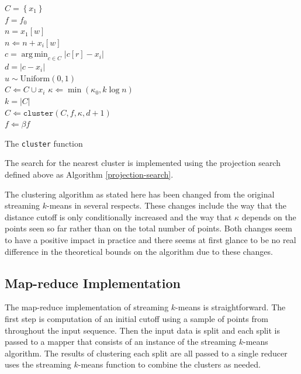 \documentclass[11pt]{amsart}
\DeclareMathOperator{\argmin}{arg\,min}
\begin{document}
\begin{algorithm}[H]
\SetNoFillComment
{}
$C = \left \lbrace x_1 \right \rbrace$ \\
$f = f_0$ \\
$n = x_1[w]$ \\
 {
   $n \Leftarrow n + x_i[w]$ \\
   $c = \argmin_{c \in C} \left | c[r] - x_i \right |$\\
   $d = |c-x_i|$ \\
   $u \sim \mathrm{Uniform}(0,1)$\\
    {
       $C \Leftarrow C \cup  x_i$ 
   }
   $\kappa \Leftarrow \min(\kappa_0, k \log n)$ \\
    {
      $k = |C|$ \\
      $C \Leftarrow \mathtt {cluster}( C, f, \kappa, d+1 )$ \\
       {
          $ f \Leftarrow \beta f$
      }
   }
}
\caption{The {\tt cluster} function}
\end{algorithm}

The search for the nearest cluster is implemented using the projection search defined above as Algorithm \ref{projection-search}.

The clustering algorithm as stated here has been changed from the original streaming $k$-means in several respects.  These changes include the way that the distance cutoff is only conditionally increased and the way that $\kappa$ depends on the points seen so far rather than on the total number of points.  Both changes seem to have a positive impact in practice and there seems at first glance to be no real difference in the theoretical bounds on the algorithm due to these changes.
\subsection{Map-reduce Implementation}

The map-reduce implementation of streaming $k$-means is straightforward.  The first step is computation of an initial cutoff using a sample of points from throughout the input sequence.  Then the input data is split and each split is passed to a mapper that consists of an instance of the streaming $k$-means algorithm.  The results of clustering each split are all passed to a single reducer uses the streaming $k$-means function to combine the clusters as needed.
\end{document}
